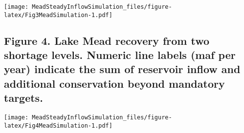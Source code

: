 \documentclass[]{article}
\begin{document}
\texttt{[image: MeadSteadyInflowSimulation\_files/figure-latex/Fig3MeadSimulation-1.pdf]}

\subsection{Figure 4. Lake Mead recovery from two shortage levels.
Numeric line labels (maf per year) indicate the sum of reservoir inflow
and additional conservation beyond mandatory
targets.}\label{figure-4.-lake-mead-recovery-from-two-shortage-levels.-numeric-line-labels-maf-per-year-indicate-the-sum-of-reservoir-inflow-and-additional-conservation-beyond-mandatory-targets.}

\texttt{[image: MeadSteadyInflowSimulation\_files/figure-latex/Fig4MeadSimulation-1.pdf]}
\end{document}
